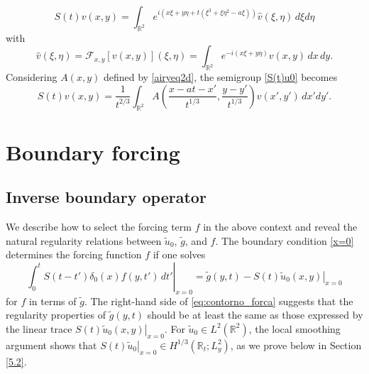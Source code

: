 \documentclass[11pt]{article}
\numberwithin{equation}{section}
\begin{document}
\begin{equation}\label{S(t)u0}
    S(t)v(x,y) = \int_{\mathbb{R}^2} e^{i(x\xi + y\eta + t(\xi^{3}+\xi\eta^{2}-a\xi))} \widehat{v}(\xi, \eta) \, d\xi d\eta
\end{equation}
with
\begin{equation}
    \hat{v}(\xi, \eta)=\mathcal{F}_{x,y}[v(x,y)](\xi,\eta)=\int_{\mathbb{R}^{2}} e^{-i(x\xi+y\eta)}v(x,y)\, dx\, dy.
\end{equation}
Considering $A(x,y)$ defined by \eqref{airyeq2d}, the semigroup \eqref{S(t)u0} becomes
\begin{equation}\label{S(t)airy}
S(t)v(x,y)=\frac{1}{t^{2/3}} \int_{\mathbb{R}^2} A\left( \frac{x-at-x'}{t^{1/3}}, \frac{y-y'}{t^{1/3}} \right) v(x',y') \, dx' dy'.
\end{equation}

\section{Boundary forcing}

\subsection{Inverse boundary operator}

We describe how to select the forcing term $f$ in the above context and reveal the natural regularity relations between $\tilde{u}_0$, $\tilde{g}$, and $f$. The boundary condition \eqref{x=0} determines the forcing function $f$ if one solves
\begin{equation} \label{eq:contorno_forca}
    \left. \int_0^t S(t-t')\delta_0(x) f(y,t') \, dt' \right|_{x=0} = \tilde{g}(y,t) - \left. S(t)\tilde{u}_0(x,y) \right|_{x=0}
\end{equation}
for $f$ in terms of $\tilde{g}$. The right-hand side of \eqref{eq:contorno_forca} suggests that the regularity properties of $\tilde{g}(y,t)$ should be at least the same as those expressed by the linear trace $\left. S(t)\tilde{u}_0(x,y) \right|_{x=0}$. For $\tilde{u}_0 \in L^2(\mathbb{R}^2)$, the local smoothing argument shows that $\left. S(t)\tilde{u}_0 \right|_{x=0} \in H^{1/3}(\mathbb{R}_t; L^2_y)$, as we prove below in Section \ref{5.2}.
\end{document}
